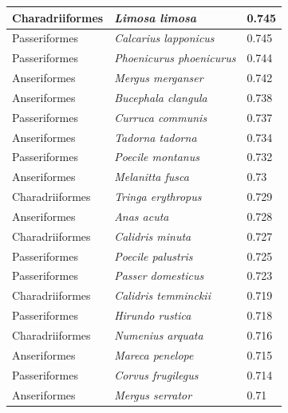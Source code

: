 \documentclass{article}
\begin{document}
\begin{longtable}{|p{} | p{} | p{} |}
  Charadriiformes & \textit{Limosa limosa}                 & 0.745                \\ \hline
  Passeriformes   & \textit{Calcarius lapponicus}          & 0.745                \\ \hline
  Passeriformes   & \textit{Phoenicurus phoenicurus}       & 0.744                \\ \hline
  Anseriformes    & \textit{Mergus merganser}              & 0.742                \\ \hline
  Anseriformes    & \textit{Bucephala clangula}            & 0.738                \\ \hline
  Passeriformes   & \textit{Curruca communis}              & 0.737                \\ \hline
  Anseriformes    & \textit{Tadorna tadorna}               & 0.734                \\ \hline
  Passeriformes   & \textit{Poecile montanus}              & 0.732                \\ \hline
  Anseriformes    & \textit{Melanitta fusca}               & 0.73                 \\ \hline
  Charadriiformes & \textit{Tringa erythropus}             & 0.729                \\ \hline
  Anseriformes    & \textit{Anas acuta}                    & 0.728                \\ \hline
  Charadriiformes & \textit{Calidris minuta}               & 0.727                \\ \hline
  Passeriformes   & \textit{Poecile palustris}             & 0.725                \\ \hline
  Passeriformes   & \textit{Passer domesticus}             & 0.723                \\ \hline
  Charadriiformes & \textit{Calidris temminckii}           & 0.719                \\ \hline
  Passeriformes   & \textit{Hirundo rustica}               & 0.718                \\ \hline
  Charadriiformes & \textit{Numenius arquata}              & 0.716                \\ \hline
  Anseriformes    & \textit{Mareca penelope}               & 0.715                \\ \hline
  Passeriformes   & \textit{Corvus frugilegus}             & 0.714                \\ \hline
  Anseriformes    & \textit{Mergus serrator}               & 0.71                 \\ \hline

\end{longtable}
\end{document}
